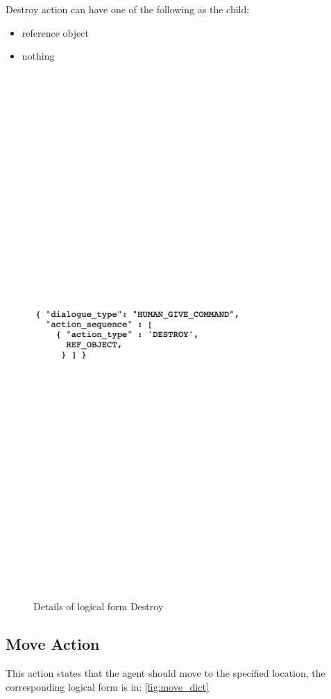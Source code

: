 Destroy action can have one of the following as the child:
\begin{itemize}
	\setlength\itemsep{0.0em}
	\item reference object
	\item nothing
\end{itemize}
\begin{figure}[h]
    \centering
    \includegraphics[width=8cm,height=20cm,keepaspectratio]{figures/destroy.png}
    \caption{Details of logical form  Destroy} 
    \label{fig:destroy_dict}
\end{figure}

\subsection{Move Action}
This action states that the agent should move to the specified location, the corresponding logical form  is in: \ref{fig:move_dict}

